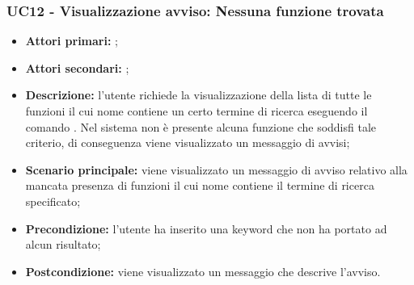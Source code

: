 \subsubsection{UC12 - Visualizzazione avviso: Nessuna funzione trovata}
\begin{itemize}
	\item \textbf{Attori primari:} \ua{};
	\item \textbf{Attori secondari:} \re{};
	\item \textbf{Descrizione:} l’utente richiede la visualizzazione della lista di tutte le funzioni il cui nome contiene un certo termine di ricerca eseguendo il comando \psearch{}. Nel sistema non è presente alcuna funzione che soddisfi tale criterio, di conseguenza viene visualizzato un messaggio di avvisi; 
	\item \textbf{Scenario principale:} viene visualizzato un messaggio di avviso relativo alla mancata presenza di funzioni il cui nome contiene il termine di ricerca specificato;
	\item \textbf{Precondizione:} l’utente ha inserito una keyword che non ha portato ad alcun risultato;
	\item \textbf{Postcondizione:} viene visualizzato un messaggio che descrive l'avviso.
\end{itemize}